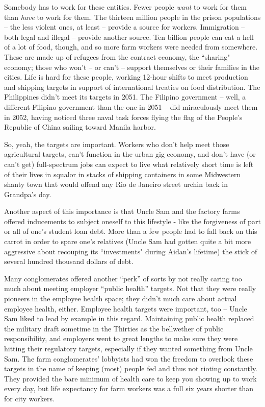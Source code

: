 \documentclass[11pt]{book}
\begin{document}
	Somebody has to work for these entities. Fewer people \textit{want} to work for them than \textit{have} to work for them. The thirteen million people in the prison populations -- the less violent ones, at least -- provide a source for workers. Immigration -- both legal and illegal -- provide another source. Ten billion people can eat a hell of a lot of food, though, and so more farm workers were needed from somewhere. These are made up of refugees from the contract economy, the ``sharing" economy; those who won't -- or can't -- support themselves or their families in the cities. Life is hard for these people, working 12-hour shifts to meet production and shipping targets in support of international treaties on food distribution. The Philippines didn't meet its targets in 2051. The Filipino government -- well, a different Filipino government than the one in 2051 -- did miraculously meet them in 2052, having noticed three naval task forces flying the flag of the People's Republic of China sailing toward Manila harbor.
	
	So, yeah, the targets are important. Workers who don't help meet those agricultural targets, can't function in the urban gig economy, and don't have (or can't get) full-spectrum jobs can expect to live what relatively short time is left of their lives in squalor in stacks of shipping containers in some Midwestern shanty town that would offend any Rio de Janeiro street urchin back in Grandpa's day.
	
	Another aspect of this importance is that Uncle Sam and the factory farms offered inducements to subject oneself to this lifestyle - like the forgiveness of part or all of one's student loan debt. More than a few people had to fall back on this carrot in order to spare one's relatives (Uncle Sam had gotten quite a bit more aggressive about recouping its ``investments" during Aidan's lifetime) the stick of several hundred thousand dollars of debt. 
	
	Many conglomerates offered another ``perk'' of sorts by not really caring too much about meeting employer ``public health'' targets. Not that they were really pioneers in the employee health space; they didn't much care about actual employee health, either. Employee health targets were important, too -- Uncle Sam liked to lead by example in this regard. Maintaining public health replaced the military draft sometime in the Thirties as the bellwether of public responsibility, and employers went to great lengths to make sure they were hitting their regulatory targets, especially if they wanted something from Uncle Sam. The farm conglomerates' lobbyists had won the freedom to overlook these targets in the name of keeping (most) people fed and thus not rioting constantly. They provided the bare minimum of health care to keep you showing up to work every day, but life expectancy for farm workers was a full six years shorter than for city workers. 
	
\end{document}
